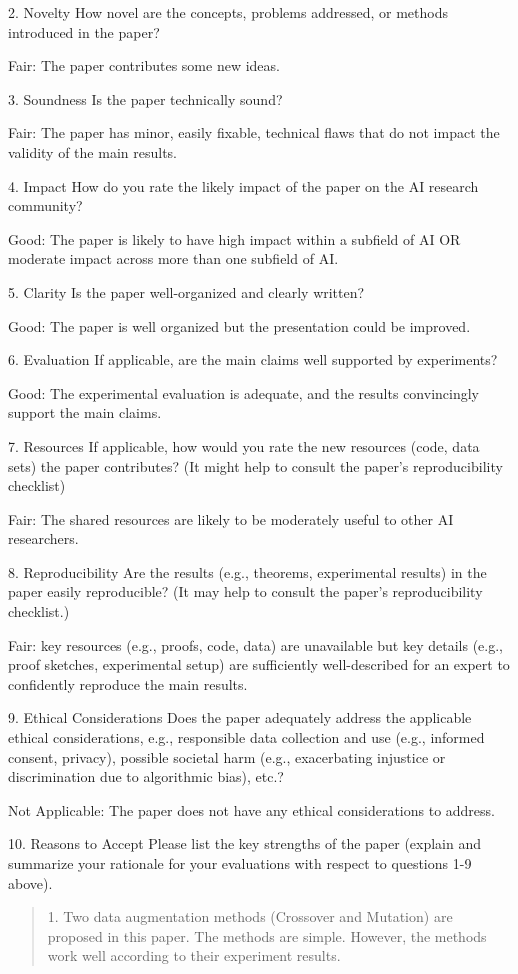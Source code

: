 \documentclass{article}
\begin{document}
2. {Novelty} How novel are the concepts, problems addressed, or methods introduced in the paper?

Fair: The paper contributes some new ideas.

3. {Soundness} Is the paper technically sound?

Fair: The paper has minor, easily fixable, technical flaws that do not impact the validity of the main results.

4. {Impact} How do you rate the likely impact of the paper on the AI research community?

Good: The paper is likely to have high impact within a subfield of AI OR moderate impact across more than one subfield of AI.

5. {Clarity} Is the paper well-organized and clearly written?

Good: The paper is well organized but the presentation could be improved.

6. {Evaluation} If applicable, are the main claims well supported by experiments?

Good: The experimental evaluation is adequate, and the results convincingly support the main claims.

7. {Resources} If applicable, how would you rate the new resources (code, data sets) the paper contributes? (It might help to consult the paper’s reproducibility checklist)

Fair: The shared resources are likely to be moderately useful to other AI researchers.

8. {Reproducibility} Are the results (e.g., theorems, experimental results) in the paper easily reproducible? (It may help to consult the paper’s reproducibility checklist.)

Fair: key resources (e.g., proofs, code, data) are unavailable but key details (e.g., proof sketches, experimental setup) are sufficiently well-described for an expert to confidently reproduce the main results.

9. {Ethical Considerations} Does the paper adequately address the applicable ethical considerations, e.g., responsible data collection and use (e.g., informed consent, privacy), possible societal harm (e.g., exacerbating injustice or discrimination due to algorithmic bias), etc.?

Not Applicable: The paper does not have any ethical considerations to address.

10. {Reasons to Accept} Please list the key strengths of the paper (explain and summarize your rationale for your evaluations with respect to questions 1-9 above).
\begin{quote}
    1. Two data augmentation methods (Crossover and Mutation) are proposed in this paper. The methods are simple. However, the methods work well according to their experiment results.
\end{quote}
\end{document}
